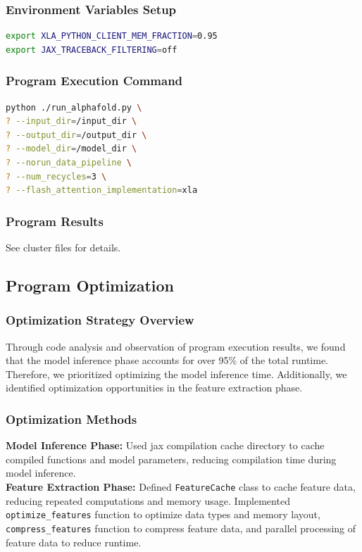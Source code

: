 \documentclass[a4paper,12pt]{article}
\begin{document}
\subsubsection{Environment Variables Setup}
\begin{lstlisting}[language=bash]
export XLA_PYTHON_CLIENT_MEM_FRACTION=0.95
export JAX_TRACEBACK_FILTERING=off
\end{lstlisting}

\subsubsection{Program Execution Command}
\begin{lstlisting}[language=bash]
python ./run_alphafold.py \
? --input_dir=/input_dir \
? --output_dir=/output_dir \
? --model_dir=/model_dir \
? --norun_data_pipeline \
? --num_recycles=3 \
? --flash_attention_implementation=xla
\end{lstlisting}

\subsubsection{Program Results}
See cluster files for details.

\subsection{Program Optimization}

\subsubsection{Optimization Strategy Overview}
Through code analysis and observation of program execution results, we found that the model inference phase accounts for over 95\% of the total runtime. Therefore, we prioritized optimizing the model inference time. Additionally, we identified optimization opportunities in the feature extraction phase.

\subsubsection{Optimization Methods}
\textbf{Model Inference Phase:} Used jax compilation cache directory to cache compiled functions and model parameters, reducing compilation time during model inference. \\
\textbf{Feature Extraction Phase:} Defined \texttt{FeatureCache} class to cache feature data, reducing repeated computations and memory usage. Implemented \texttt{optimize\_features} function to optimize data types and memory layout, \texttt{compress\_features} function to compress feature data, and parallel processing of feature data to reduce runtime.
\end{document}

